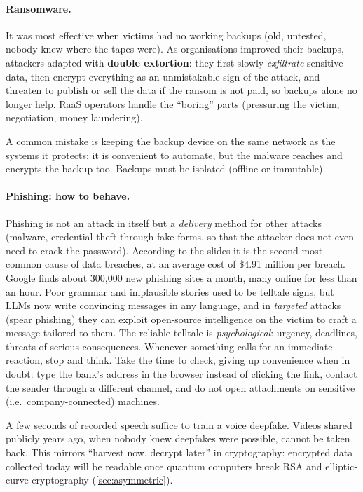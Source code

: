 \paragraph{Ransomware.} It was most effective when victims had no working backups (old, untested, nobody knew where the tapes were). As organisations improved their backups, attackers adapted with \textbf{double extortion}: they first slowly \emph{exfiltrate} sensitive data, then encrypt everything as an unmistakable sign of the attack, and threaten to publish or sell the data if the ransom is not paid, so backups alone no longer help. RaaS operators handle the \enquote{boring} parts (pressuring the victim, negotiation, money laundering).

\begin{remark}
A common mistake is keeping the backup device on the same network as the systems it protects: it is convenient to automate, but the malware reaches and encrypts the backup too. Backups must be isolated (offline or immutable).
\end{remark}

\paragraph{Phishing: how to behave.} Phishing is not an attack in itself but a \emph{delivery} method for other attacks (malware, credential theft through fake forms, so that the attacker does not even need to crack the password). According to the slides it is the second most common cause of data breaches, at an average cost of \$4.91 million per breach. Google finds about 300{,}000 new phishing sites a month, many online for less than an hour. Poor grammar and implausible stories used to be telltale signs, but LLMs now write convincing messages in any language, and in \emph{targeted} attacks (spear phishing) they can exploit open-source intelligence on the victim to craft a message tailored to them. The reliable telltale is \emph{psychological}: urgency, deadlines, threats of serious consequences. Whenever something calls for an immediate reaction, stop and think. Take the time to check, giving up convenience when in doubt: type the bank's address in the browser instead of clicking the link, contact the sender through a different channel, and do not open attachments on sensitive (i.e.\ company-connected) machines.

\begin{remark}
A few seconds of recorded speech suffice to train a voice deepfake. Videos shared publicly years ago, when nobody knew deepfakes were possible, cannot be taken back. This mirrors \enquote{harvest now, decrypt later} in cryptography: encrypted data collected today will be readable once quantum computers break RSA and elliptic-curve cryptography (\cref{sec:asymmetric}).
\end{remark}

